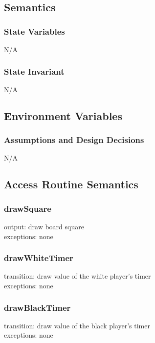 \documentclass[12pt, titlepage]{article}
\begin{document}
    \subsection*{Semantics}
        \subsubsection*{State Variables}
            N/A

        \subsubsection*{State Invariant}
            N/A
            
    \subsection*{Environment Variables}

        \subsubsection*{Assumptions and Design Decisions}
            N/A
            
    \subsection*{Access Routine Semantics}
    
        \subsubsection*{drawSquare}
            output: draw board square \\ 
            exceptions: none 
            
        \subsubsection*{drawWhiteTimer}
            transition: draw value of the white player's timer \\
            exceptions: none 
            
        \subsubsection*{drawBlackTimer}
            transition: draw value of the black player's timer \\
            exceptions: none 
            
\end{document}

